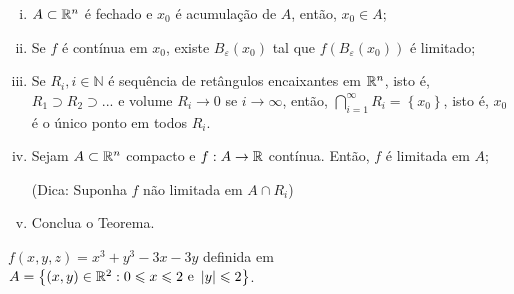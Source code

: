 \documentclass{book}
\begin{document}
\begin{dem}
\begin{enumerate}[(i)]
      \item $A \subset \mathbb{R}^n$ \'e fechado e $x_0$ \'e acumula\c c\~ao de $A$, ent\~ao, $x_0 \in A$;
      \item Se $f$ \'e cont\'inua em $x_0$, existe $B_\varepsilon  \left( {x_0 } \right)$ tal que $f\left( {B_\varepsilon  \left( {x_0 } \right)} \right)$ \'e limitado;
      \item Se $R_i ,i \in \mathbb{N}$ \'e sequ\^encia de ret\^angulos encaixantes em $\mathbb{R}^n$, isto \'e, $R_1  \supset R_2  \supset ...$ e volume $R_i  \to 0$ se $i \to \infty$, ent\~ao, $\bigcap\limits_{i = 1}^\infty  {R_i }  = \left\{ {x_0 } \right\}$, isto \'e, $x_0$ \'e o \'unico ponto em todos $R_i$.
      \item Sejam $A \subset \mathbb{R}^n$ compacto e $f:A \to \mathbb{R}$ cont\'inua. Ent\~ao, $f$ \'e limitada em $A$;

(Dica: Suponha $f$ n\~ao limitada em $A \cap R_i$)
\item Conclua o Teorema.
\end{enumerate}
\end{dem}

\begin{ex}
$f\left( {x,y,z} \right) = x^3  + y^3  - 3x - 3y$ definida em \\
$A = \left\{ {\left( {x,y} \right) \in \mathbb{R}^2 :0 \leqslant x \leqslant 2{\text{ e }}\left| y \right| \leqslant 2} \right\}$.
\end{ex}
\end{document}
